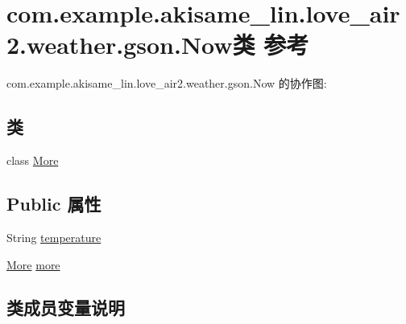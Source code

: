 \hypertarget{classcom_1_1example_1_1akisame__lin_1_1love__air2_1_1weather_1_1gson_1_1_now}{}\section{com.\+example.\+akisame\+\_\+lin.\+love\+\_\+air2.\+weather.\+gson.\+Now类 参考}
\label{classcom_1_1example_1_1akisame__lin_1_1love__air2_1_1weather_1_1gson_1_1_now}


com.\+example.\+akisame\+\_\+lin.\+love\+\_\+air2.\+weather.\+gson.\+Now 的协作图\+:
\subsection*{类}
\begin{DoxyCompactItemize}
\item 
class \mbox{\hyperlink{classcom_1_1example_1_1akisame__lin_1_1love__air2_1_1weather_1_1gson_1_1_now_1_1_more}{More}}
\end{DoxyCompactItemize}
\subsection*{Public 属性}
\begin{DoxyCompactItemize}
\item 
String \mbox{\hyperlink{classcom_1_1example_1_1akisame__lin_1_1love__air2_1_1weather_1_1gson_1_1_now_a33285f574d0fe17236937be8d306880e}{temperature}}
\item 
\mbox{\hyperlink{classcom_1_1example_1_1akisame__lin_1_1love__air2_1_1weather_1_1gson_1_1_now_1_1_more}{More}} \mbox{\hyperlink{classcom_1_1example_1_1akisame__lin_1_1love__air2_1_1weather_1_1gson_1_1_now_abaee695604ba01d1d42ceba4aaf5b65d}{more}}
\end{DoxyCompactItemize}


\subsection{类成员变量说明}
\mbox{\label{classcom_1_1example_1_1akisame__lin_1_1love__air2_1_1weather_1_1gson_1_1_now_abaee695604ba01d1d42ceba4aaf5b65d}} 
